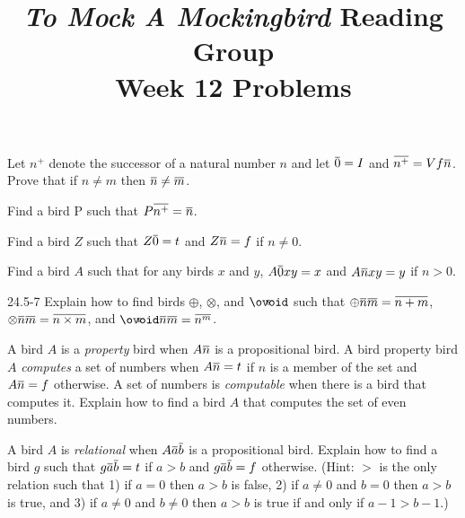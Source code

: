 \documentclass[12pt, letterpaper]{article}
\title{\emph{To Mock A Mockingbird} Reading Group\\Week 12 Problems}
\begin{document}
\maketitle

\disclaimer

\begin{prob}{24.1}
Let $n^+$ denote the successor of a natural number $n$ and let $\noverline{0} = I$ and $\noverline{n^+} = Vf\noverline{n}$. Prove that if $n \neq m$ then $\noverline{n} \neq \noverline{m}$. 
\end{prob}

\begin{prob}{24.2}
Find a bird P such that $P\noverline{n^+} = \noverline{n}$.
\end{prob}

\begin{prob}{24.3}
Find a bird $Z$ such that $Z\noverline{0} = t$ and $Z\noverline{n} = f$ if $n \neq 0$. 
\end{prob}

\begin{prob}{24.4}
Find a bird $A$ such that for any birds $x$ and $y$, $A\noverline{0}xy = x$ and $A\noverline{n}xy = y$ if $n > 0$. 
\end{prob}

\begin{prob}{24.5-7}
Explain how to find birds $\oplus$, $\otimes$, and $\oexp$ such that $\oplus\noverline{n}\noverline{m} = \noverline{n + m}$, $\otimes\noverline{n}\noverline{m} = \noverline{n \times m}$, and $\oexp\noverline{n}\noverline{m} = \noverline{n^m}$.
\end{prob}

\begin{prob}{24.8}
A bird $A$ is a \emph{property} bird when $A\noverline{n}$ is a propositional bird. A bird property bird $A$ \emph{computes} a set of numbers when $A\noverline{n} = t$ if $n$ is a member of the set and $A\noverline{n} = f$ otherwise. A set of numbers is \emph{computable} when there is a bird that computes it. Explain how to find a bird $A$ that computes the set of even numbers.
\end{prob}

\begin{prob}{24.9}
A bird $A$ is \emph{relational} when $A\noverline{a}\noverline{b}$ is a propositional bird. Explain how to find a bird $g$ such that $g\noverline{a}\noverline{b} = t$ if $a > b$ and $g\noverline{a}\noverline{b} = f$ otherwise. (Hint: $>$ is the only relation such that 1) if $a = 0$ then $a > b$ is false, 2) if $a \neq 0$ and $b = 0$ then $a > b$ is true, and 3) if $a \neq 0$ and $b \neq 0$ then $a > b$ is true if and only if $a - 1 > b - 1$.)
\end{prob}
\end{document}
